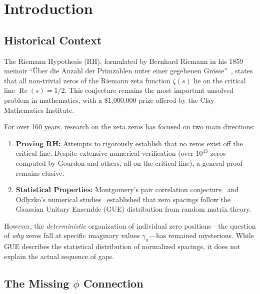 \documentclass[11pt,a4paper]{article}
\DeclareMathOperator{\Rea}{Re}
\begin{document}
\tableofcontents
\newpage

\section{Introduction}

\subsection{Historical Context}

The Riemann Hypothesis (RH), formulated by Bernhard Riemann in his 1859 memoir ``\"Uber die Anzahl der Primzahlen unter einer gegebenen Gr\"osse''~\cite{riemann1859}, states that all non-trivial zeros of the Riemann zeta function $\zeta(s)$ lie on the critical line $\Rea(s) = 1/2$. This conjecture remains the most important unsolved problem in mathematics, with a \$1,000,000 prize offered by the Clay Mathematics Institute.

For over 160 years, research on the zeta zeros has focused on two main directions:
\begin{enumerate}[leftmargin=*,itemsep=2pt]
    \item \textbf{Proving RH:} Attempts to rigorously establish that no zeros exist off the critical line. Despite extensive numerical verification (over $10^{13}$ zeros computed by Gourdon and others, all on the critical line), a general proof remains elusive.
    \item \textbf{Statistical Properties:} Montgomery's pair correlation conjecture~\cite{montgomery1973} and Odlyzko's numerical studies~\cite{odlyzko1987, odlyzko2001} established that zero spacings follow the Gaussian Unitary Ensemble (GUE) distribution from random matrix theory.
\end{enumerate}

However, the \emph{deterministic} organization of individual zero positions—the question of \emph{why} zeros fall at specific imaginary values $\gamma_n$—has remained mysterious. While GUE describes the statistical distribution of normalized spacings, it does not explain the actual sequence of gaps.

\subsection{The Missing $\phi$ Connection}
\end{document}

